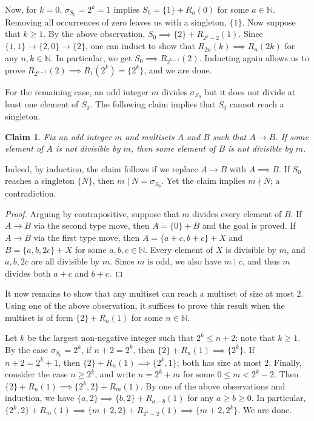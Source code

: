 \documentclass{article}
\newcommand{\N}{\mathbb{N}}
\newtheorem*{claim}{Claim}
\begin{document}
Now, for $k = 0$, $\sigma_{S_0} = 2^k = 1$ implies $S_0 = \{1\} + R_a(0)$ for some $a \in \N$.
Removing all occurrences of zero leaves us with a singleton, $\{1\}$.
Now suppose that $k \geq 1$.
By the above observation, $S_0 \implies \{2\} + R_{2^k - 2}(1)$.
Since $\{1, 1\} \to \{2, 0\} \to \{2\}$, one can induct to show that $R_{2n}(k) \implies R_n(2k)$ for any $n, k \in \N$.
In particular, we get $S_0 \implies R_{2^{k - 1}}(2)$.
Inducting again allows us to prove $R_{2^{k - 1}}(2) \implies R_1(2^k) = \{2^k\}$, and we are done.

For the remaining case, an odd integer $m$ divides $\sigma_{S_0}$ but it does not divide at least one element of $S_0$.
The following claim implies that $S_0$ cannot reach a singleton.

\begin{claim}
Fix an odd integer $m$ and multisets $A$ and $B$ such that $A \to B$.
If some element of $A$ is not divisible by $m$, then some element of $B$ is not divisible by $m$.
\end{claim}

Indeed, by induction, the claim follows if we replace $A \to B$ with $A \implies B$.
If $S_0$ reaches a singleton $\{N\}$, then $m \mid N = \sigma_{S_0}$.
Yet the claim implies $m \nmid N$; a contradiction.

\begin{proof}
Arguing by contrapositive, suppose that $m$ divides every element of $B$.
If $A \to B$ via the second type move, then $A = \{0\} + B$ and the goal is proved.
If $A \to B$ via the first type move, then $A = \{a + c, b + c\} + X$ and $B = \{a, b, 2c\} + X$ for some $a, b, c \in \N$.
Every element of $X$ is divisible by $m$, and $a, b, 2c$ are all divisible by $m$.
Since $m$ is odd, we also have $m \mid c$, and thus $m$ divides both $a + c$ and $b + c$.
\end{proof}

It now remains to show that any multiset can reach a multiset of size at most $2$.
Using one of the above observation, it suffices to prove this result when the multiset is of form $\{2\} + R_n(1)$ for some $n \in \N$.

Let $k$ be the largest non-negative integer such that $2^k \leq n + 2$; note that $k \geq 1$.
By the case $\sigma_{S_0} = 2^k$, if $n + 2 = 2^k$, then $\{2\} + R_n(1) \implies \{2^k\}$.
If $n + 2 = 2^k + 1$, then $\{2\} + R_n(1) \implies \{2^k, 1\}$; both has size at most $2$.
Finally, consider the case $n \geq 2^k$, and write $n = 2^k + m$ for some $0 \leq m < 2^k - 2$.
Then $\{2\} + R_n(1) \implies \{2^k, 2\} + R_m(1)$.
By one of the above observations and induction, we have $\{a, 2\} \implies \{b, 2\} + R_{a - b}(1)$ for any $a \geq b \geq 0$.
In particular, $\{2^k, 2\} + R_m(1) \implies \{m + 2, 2\} + R_{2^k - 2}(1) \implies \{m + 2, 2^k\}$.
We are done.
\end{document}
